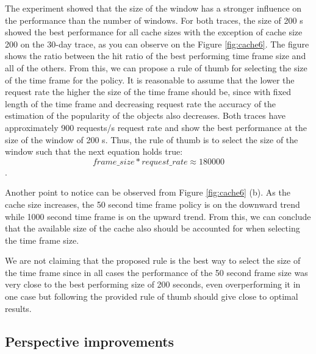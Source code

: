 The experiment showed that the size of the window has a stronger influence on the performance than the number of windows. For both traces, the size of 200 s showed the best performance for all cache sizes with the exception of cache size 200 on the 30-day trace, as you can observe on the Figure \ref{fig:cache6}. The figure shows the ratio between the hit ratio of the best performing time frame size and all of the others. From this, we can propose a rule of thumb for selecting the size of the time frame for the policy. It is reasonable to assume that the lower the request rate the higher the size of the time frame should be, since with fixed length of the time frame and decreasing request rate the accuracy of the estimation of the popularity of the objects also decreases. Both traces have approximately 900 requests/s request rate and show the best performance at the size of the window of 200 s. Thus, the rule of thumb is to select the size of the window such that the next equation holds true: $$ frame\_size * request\_rate \approx  180000 $$.

Another point to notice can be observed from Figure \ref{fig:cache6} (b). As the cache size increases, the 50 second time frame policy is on the downward trend while 1000 second time frame is on the upward trend.  From this, we can conclude that the available size of the cache also should be accounted for when selecting the time frame size.

We are not claiming that the proposed rule is the best way to select the size of the time frame since in all cases the performance of the 50 second frame size was very close to the best performing size of 200 seconds, even overperforming it in one case but following the provided rule of thumb should give close to optimal results.

\subsection{Perspective improvements} \label{perspective_improvements}


